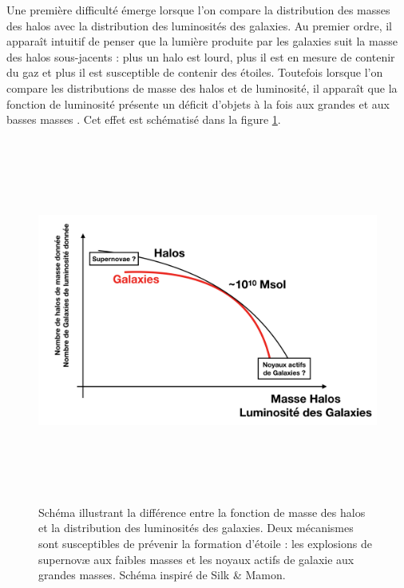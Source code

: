 Une première difficulté émerge lorsque l'on compare la distribution des masses des halos avec la distribution des luminosités des galaxies. Au premier ordre, il apparaît intuitif de penser que la lumière produite par les galaxies suit la masse des halos sous-jacents : plus un halo est lourd, plus il est en mesure de contenir du gaz et plus il est susceptible de contenir des étoiles. Toutefois lorsque l'on compare les distributions de masse des halos et de luminosité, il apparaît que la fonction de luminosité présente un déficit d'objets à la fois aux grandes et aux basses masses . Cet effet est schématisé dans la figure \ref{f:silkmamon}.
\begin{figure}[htbp]
	\centering
		\includegraphics[height=12cm]{figs/SilkMamon.png}
	\caption[Schéma illustrant la différence entre la fonction de masse des halos et la distribution des luminosités des galaxies]{Schéma illustrant la différence entre la fonction de masse des halos et la distribution des luminosités des galaxies. Deux mécanismes sont susceptibles de prévenir la formation d'étoile : les explosions de supernovæ aux faibles masses et les noyaux actifs de galaxie aux grandes masses.  Schéma inspiré de Silk \& Mamon. } 
	\label{f:silkmamon}
\end{figure}
